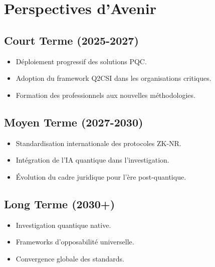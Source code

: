\documentclass[11pt,a4paper,oneside]{book}
\begin{document}
        \section*{Perspectives d'Avenir}
            \subsection*{Court Terme (2025-2027)}
                \begin{itemize}
                    \item Déploiement progressif des solutions PQC.
                    \item Adoption du framework Q2CSI dans les organisations critiques.
                    \item Formation des professionnels aux nouvelles méthodologies.
                \end{itemize}

            \subsection*{Moyen Terme (2027-2030)}
                \begin{itemize}
                    \item Standardisation internationale des protocoles ZK-NR.
                    \item Intégration de l'IA quantique dans l'investigation.
                    \item Évolution du cadre juridique pour l'ère post-quantique.
                \end{itemize}

            \subsection*{Long Terme (2030+)}
                \begin{itemize}
                    \item Investigation quantique native.
                    \item Frameworks d'opposabilité universelle.
                    \item Convergence globale des standards.
                \end{itemize}
\end{document}
